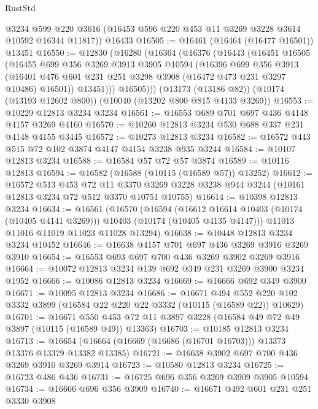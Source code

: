 \begin{lexlean}{RustStd}
\begin{coremodule}
      @3234
      @599
      @220
      @3616
      (@16453 @596 @220 @453 @11 @3269 @3228 @3614 @10592 @16344 @11817))
    @16433
@16505 := @16461 (@16464 (@16477 @16501)) @13451
@16550 := @12830
    (@16280
      (@16364
        (@16376
          (@16443
            (@16451
              @16505
              (@16455
                @699
                @356
                @3269
                @3913
                @3905
                @10594
                (@16396
                  @699
                  @356
                  @3913
                  (@16401 @476 @601 @231 @251 @3298 @3908 (@16472 @473 @231 @3297 @10486) @16501))
                @13451)))
          @16505)))
    (@13173 (@13186 @82))
    (@10174 (@13193 @12602 @800))
    (@10040 (@13202 @800 @815 @4133 @3269))
@16553 := @10229 @12813 @3234 @3234
@16561 := @16553 @689 @701 @697 @436 @4148 @4157 @3269 @4160
@16570 := @10260 @12813 @3234 @530 @688 @337 @231 @4148 @4155 @3445
@16572 := @10273 @12813 @3234
@16582 := @16572 @443 @515 @72 @102 @3874 @4147 @4154 @3238 @935 @3244
@16584 := @10107 @12813 @3234
@16588 := @16584 @57 @72 @57 @3874
@16589 := @10116 @12813
@16594 := @16582 (@16588 (@10115 (@16589 @57)) @13252)
@16612 := @16572
    @513
    @453
    @72
    @11
    @3370
    @3269
    @3228
    @3238
    @944
    @3244
    (@10161 @12813 @3234 @72 @512 @3370 @10751 @10755)
@16614 := @10398 @12813 @3234
@16634 := @16561
    (@16570
      (@16594
        (@16612 @16614 @10403 (@10174 (@10405 @4141 @3269)))
        @10403
        (@10174 (@10405 @4135 @4147)))
      @11013
      @11016
      @11019
      @11023
      @11028
      @13294)
@16638 := @10448 @12813 @3234 @3234 @10452
@16646 := @16638 @4157 @701 @697 @436 @3269 @3916 @3269 @3910
@16654 := @16553 @693 @697 @700 @436 @3269 @3902 @3269 @3916
@16664 := @10072 @12813 @3234 @139 @692 @349 @231 @3269 @3900 @3234 @1952
@16666 := @10086 @12813 @3234
@16669 := @16666 @692 @349 @3900
@16671 := @10095 @12813 @3234
@16686 := @16671
    @494
    @552
    @220
    @102
    @3332
    @3899
    (@16584 @22 @220 @22 @3332 (@10115 (@16589 @22)) @10629)
@16701 := @16671
    @550
    @453
    @72
    @11
    @3897
    @3228
    (@16584 @49 @72 @49 @3897 (@10115 (@16589 @49)) @13363)
@16703 := @10185 @12813 @3234
@16713 := @16654 (@16664 (@16669 (@16686 (@16701 @16703))) @13373 @13376 @13379 @13382 @13385)
@16721 := @16638 @3902 @697 @700 @436 @3269 @3910 @3269 @3914
@16723 := @10580 @12813 @3234
@16725 := @16723 @486 @436
@16731 := @16725 @696 @356 @3269 @3909 @3905 @10594
@16734 := @16666 @696 @356 @3909
@16740 := @16671 @492 @601 @231 @251 @3330 @3908

\end{coremodule}
\end{lexlean}
